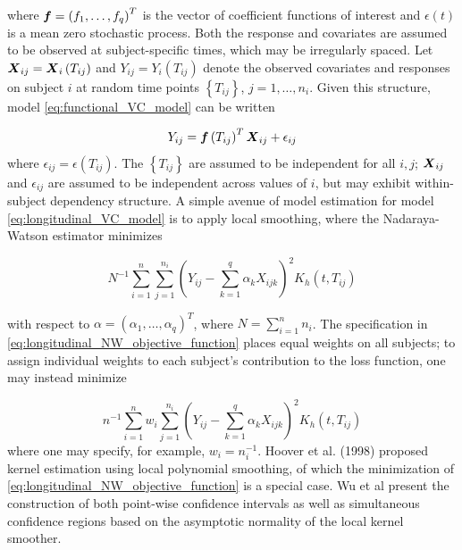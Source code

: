 \documentclass[12pt]{article}
\newcommand{\bff}{\mbox{\boldmath $f$}}
\newcommand{\bfX}{\mbox{\boldmath $X$}}
\begin{document}
where $\bff = \left(f_1,\dots, f_q \right)^T$ is the vector of coefficient functions of interest and $\epsilon\left(t\right)$ is a mean zero stochastic process. Both the response and covariates are assumed to be observed at subject-specific times, which may be irregularly spaced. Let $\bfX_{ij} = \bfX_i\left(T_{ij}\right)$ and $Y_{ij} = Y_i\left(T_{ij}\right)$ denote the observed covariates and responses on subject $i$ at random time points $\left\{ T_{ij} \right\}$, $j=1,\dots,n_i$. Given this structure, model  \ref{eq:functional_VC_model} can be written 
   
\begin{equation} \label{longitudinal_VC_model}
Y_{ij} = \bff\left(T_{ij}\right)^T\bfX_{ij} + \epsilon_{ij}
\end{equation}
\noindent
where $\epsilon_{ij} = \epsilon\left(T_{ij}\right)$. The $\left\{ T_{ij} \right\}$ are assumed to be independent for all $i,j$; $\bfX_{ij}$ and $\epsilon_{ij}$ are assumed to be independent across values of $i$, but may exhibit within-subject dependency structure.  A simple avenue of model estimation for model \ref{eq:longitudinal_VC_model} is to apply local smoothing, where the Nadaraya-Watson estimator minimizes 

\begin{equation} \label{eq:longitudinal_NW_objective_function}
N^{-1} \sum_{i=1}^{n} \sum_{j=1}^{n_i} \left(Y_{ij} - \sum_{k=1}^q \alpha_k X_{ijk} \right)^2 K_h\left(t,T_{ij}\right)
\end{equation}
\noindent

with respect to $\alpha = \left(\alpha_1,\dots, \alpha_q \right)^T$, where $N = \sum_{i=1}^n n_i$. The specification in \ref{eq:longitudinal_NW_objective_function} places equal weights on all subjects; to assign individual weights to each subject's contribution to the loss function, one may instead minimize

\begin{equation} \label{eq:longitudinal_NW_objective_function}
n^{-1} \sum_{i=1}^{n} w_i \sum_{j=1}^{n_i} \left(Y_{ij} - \sum_{k=1}^q \alpha_k X_{ijk} \right)^2 K_h\left(t,T_{ij}\right)
\end{equation}
\noindent 
where one may specify, for example, $w_i = n_i^{-1}$. Hoover et al. (1998) proposed kernel estimation using local polynomial smoothing, of which the minimization of \ref{eq:longitudinal_NW_objective_function} is a special case. Wu et al present the construction of both point-wise confidence intervals as well as simultaneous confidence regions based on the asymptotic normality of the local kernel smoother.

 
%

\end{document}
